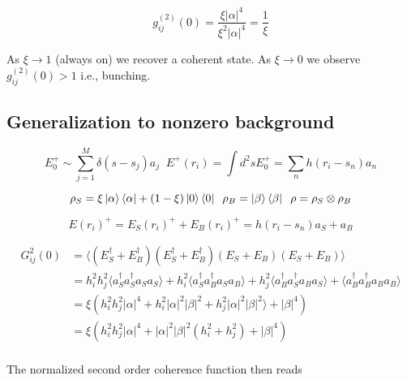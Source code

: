 \begin{equation*}
g^{(2)}_{ij}(0) = \frac{\xi\lvert\alpha\rvert^{4}}{\xi^{2}\lvert\alpha\rvert^{4}} = \frac{1}{\xi}
\end{equation*}

As $\xi\rightarrow 1$ (always on) we recover a coherent state. As $\xi\rightarrow 0$ we observe $g^{(2)}_{ij}(0) > 1$ i.e., bunching.

\subsection{Generalization to nonzero background}

\begin{equation*}
E_{0}^{+}\sim \sum_{j=1}^{M}\delta(s-s_{j})a_{j} \;\; E^{+}(r_{i}) = \int d^{2}s E_{0}^{+} = \sum_{n}h(r_{i}-s_{n})a_{n}
\end{equation*}

\begin{equation*}
\rho_{S} = \xi\ket{\alpha}\bra{\alpha} + (1-\xi)\ket{0}\bra{0}\;\;\rho_{B} = \ket{\beta}\bra{\beta}\;\;\rho = \rho_{S}\otimes\rho_{B}
\end{equation*}

\begin{equation*}
E(r_{i})^{+} = E_{S}(r_{i})^{+} + E_{B}(r_{i})^{+} = h(r_{i}-s_{n})a_{S} + a_{B}
\end{equation*}

\begin{align*}
G^{2}_{ij}(0) &= \langle(E_{S}^{\dagger} + E_{B}^{\dagger}) (E_{S}^{\dagger} + E_{B}^{\dagger})( E_{S} + E_{B}) (E_{S} + E_{B})\rangle \\
&= h_{i}^{2}h_{j}^{2}\langle a_{S}^{\dagger}a_{S}^{\dagger}a_{S}a_{S}\rangle + h_{i}^{2}\langle a_{S}^{\dagger}a_{B}^{\dagger}a_{S}a_{B}\rangle + h_{j}^{2}\langle a_{B}^{\dagger}a_{S}^{\dagger}a_{B}a_{S}\rangle  + \langle a_{B}^{\dagger}a_{B}^{\dagger}a_{B}a_{B}\rangle  \\
&= \xi(h_{i}^{2}h_{j}^{2}\lvert\alpha\rvert^{4}+ h_{i}^{2}\lvert\alpha\rvert^{2}\lvert\beta\rvert^{2} + h_{j}^{2}\lvert\alpha\rvert^{2}\lvert\beta\rvert^{2}\rangle  + \lvert\beta\rvert^{4} ) \\
&= \xi(h_{i}^{2}h_{j}^{2}\lvert\alpha\rvert^{4}+ \lvert\alpha\rvert^{2}\lvert\beta\rvert^{2}(h_{i}^{2} + h_{j}^{2})  + \lvert\beta\rvert^{4}) \\
\end{align*}

The normalized second order coherence function then reads

